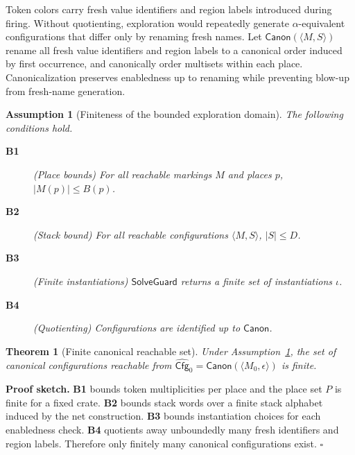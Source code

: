 \documentclass[sigconf]{acmart}
\newtheorem{theorem}{Theorem}
\newtheorem{assumption}{Assumption}
\begin{document}
Token colors carry fresh value identifiers and region labels introduced during firing. Without quotienting, exploration would repeatedly generate $\alpha$-equivalent configurations that differ only by renaming fresh names. Let $\mathsf{Canon}(\langle M,S\rangle)$ rename all fresh value identifiers and region labels
to a canonical order induced by first occurrence, and canonically order multisets within each place. Canonicalization preserves enabledness up to renaming while preventing blow-up from fresh-name generation.

\begin{assumption}[Finiteness of the bounded exploration domain]
\label{ass:finite}
The following conditions hold.
\begin{description}
\item[\textbf{B1}] (Place bounds) For all reachable markings $M$ and places $p$, $|M(p)|\le B(p)$.
\item[\textbf{B2}] (Stack bound) For all reachable configurations $\langle M,S\rangle$, $|S|\le D$.
\item[\textbf{B3}] (Finite instantiations) $\mathsf{SolveGuard}$ returns a finite set of instantiations $\iota$.
\item[\textbf{B4}] (Quotienting) Configurations are identified up to $\mathsf{Canon}$.
\end{description}
\end{assumption}

\begin{theorem}[Finite canonical reachable set]
\label{thm:finite-state}
Under Assumption~\ref{ass:finite}, the set of canonical configurations
reachable from $\widehat{\mathsf{Cfg}}_0=\mathsf{Canon}(\langle M_0,\epsilon\rangle)$ is finite.
\end{theorem}
\noindent\textbf{Proof sketch.}
\textbf{B1} bounds token multiplicities per place and the place set $P$ is finite for a fixed crate.
\textbf{B2} bounds stack words over a finite stack alphabet induced by the net construction.
\textbf{B3} bounds instantiation choices for each enabledness check.
\textbf{B4} quotients away unboundedly many fresh identifiers and region labels.
Therefore only finitely many canonical configurations exist. \hfill $\square$
\end{document}
